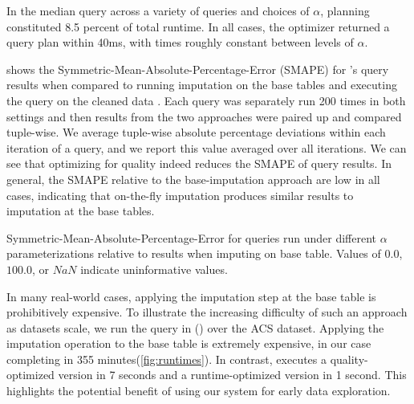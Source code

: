 
In the median query across a variety of queries and choices of $\alpha$, planning
constituted 8.5 percent of total runtime. In all cases, the optimizer
returned a query plan within 40ms, with times roughly constant between levels of $\alpha$.



 shows the Symmetric-Mean-Absolute-Percentage-Error (SMAPE) for \ProjectName{}'s query results when compared to running imputation on the base tables and executing the query on the cleaned data .
Each query was separately run 200 times in both settings and then results from the two approaches were paired up and compared tuple-wise.
We average tuple-wise absolute percentage deviations within each iteration of a query, and we report this value averaged over all iterations.
We can see that optimizing for quality indeed reduces the SMAPE of query results.
In general, the SMAPE relative to the base-imputation approach are low in all cases, indicating that on-the-fly imputation produces similar results to imputation at the base tables.

\begin{table}
\centering

\caption{Symmetric-Mean-Absolute-Percentage-Error for queries run under different $\alpha$
    parameterizations relative to results when imputing on base table. Values of $0.0$,
    $100.0$, or $NaN$ indicate uninformative values.} %
\label{table:smape}
\end{table}

In many real-world cases, applying the imputation step at the base table is prohibitively
expensive.
To illustrate the increasing difficulty of such an approach as datasets scale, we run the
query in () over the ACS dataset.
Applying the imputation operation to the base table is extremely expensive, in our case
completing in 355 minutes(\ref{fig:runtimes}). In contrast, \ProjectName{} executes a quality-optimized version
in 7 seconds and a runtime-optimized version in 1 second. This highlights the potential
benefit of using our system for early data exploration.

